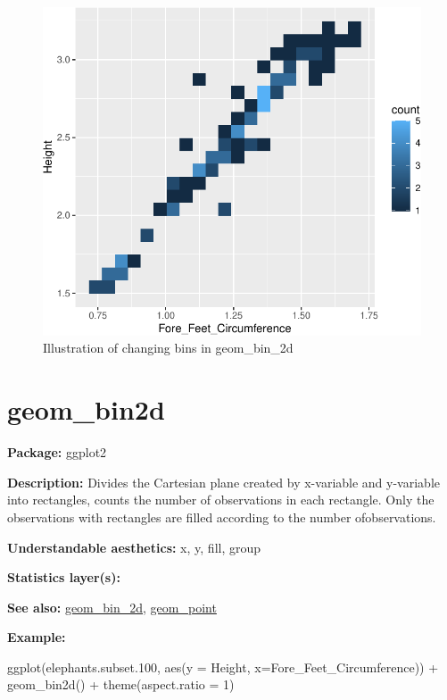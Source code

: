 \documentclass[
]{book}
\newenvironment{Shaded}{\begin{snugshade}}{\end{snugshade}}
\newcommand{\AttributeTok}[1]{\textcolor[rgb]{0.77,0.63,0.00}{#1}}
\newcommand{\DecValTok}[1]{\textcolor[rgb]{0.00,0.00,0.81}{#1}}
\newcommand{\FloatTok}[1]{\textcolor[rgb]{0.00,0.00,0.81}{#1}}
\newcommand{\FunctionTok}[1]{\textcolor[rgb]{0.00,0.00,0.00}{#1}}
\newcommand{\NormalTok}[1]{#1}
\newcommand{\SpecialCharTok}[1]{\textcolor[rgb]{0.00,0.00,0.00}{#1}}
\begin{document}
\begin{figure}
\centering
\includegraphics{Data-Visualisation-geom-Encyclopedia_files/figure-latex/unnamed-chunk-24-1.pdf}
\caption{\label{fig:unnamed-chunk-24}Illustration of changing bins in geom\_bin\_2d}
\end{figure}

\hypertarget{geom_bin2d}{%
\section{geom\_bin2d}\label{geom_bin2d}}

\textbf{Package: } ggplot2 \autocite{R-ggplot2}

\textbf{Description: } Divides the Cartesian plane created by x-variable and y-variable into rectangles, counts the number of observations in each rectangle. Only the observations with rectangles are filled according to the number ofobservations.

\textbf{Understandable aesthetics: } x, y, fill, group

\textbf{Statistics layer(s): }

\textbf{See also: } \protect\hyperlink{bin_2d}{geom\_bin\_2d}, \protect\hyperlink{point}{geom\_point}

\textbf{Example:}

\begin{Shaded}
\begin{Highlighting}[]
\FunctionTok{ggplot}\NormalTok{(elephants.subset}\FloatTok{.100}\NormalTok{, }\FunctionTok{aes}\NormalTok{(}\AttributeTok{y =}\NormalTok{ Height, }\AttributeTok{x=}\NormalTok{Fore\_Feet\_Circumference)) }\SpecialCharTok{+}
  \FunctionTok{geom\_bin2d}\NormalTok{() }\SpecialCharTok{+} 
  \FunctionTok{theme}\NormalTok{(}\AttributeTok{aspect.ratio =} \DecValTok{1}\NormalTok{)}
\end{Highlighting}
\end{Shaded}
\end{document}
